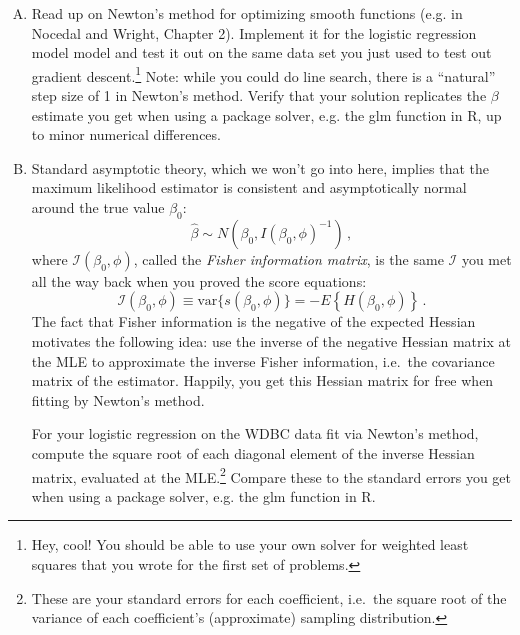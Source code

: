 \documentclass[11pt]{article}
\begin{document}
\begin{enumerate}[(A)]
\item  Read up on Newton's method for optimizing smooth functions (e.g. in Nocedal and Wright, Chapter 2).  Implement it for the logistic regression model model and test it out on the same data set you just used to test out gradient descent.\footnote{Hey, cool!  You should be able to use your own solver for weighted least squares that you wrote for the first set of problems.}  Note: while you could do line search, there is a ``natural'' step size of 1 in Newton's method.  Verify that your solution replicates the $\beta$ estimate you get when using a package solver, e.g. the glm function in R, up to minor numerical differences.  

\item Standard asymptotic theory, which we won't go into here, implies that the maximum likelihood estimator is consistent and asymptotically normal around the true value $\beta_0$:
$$
\hat{\beta} \sim N(\beta_0, I(\beta_0, \phi)^{-1}) \, ,
$$
where $\mathcal{I}(\beta_0, \phi)$, called the \textit{Fisher information matrix}, is the same $\mathcal{I}$ you met all the way back when you proved the score equations:  
$$
\mathcal{I}(\beta_0, \phi) \equiv \mbox{var} \{ s(\beta_0, \phi) \}  = - E \left\{ H(\beta_0, \phi) \right\} \, .
$$
The fact that Fisher information is the negative of the expected Hessian motivates the following idea: use the inverse of the negative Hessian matrix at the MLE to approximate the inverse Fisher information, i.e.~the covariance matrix of the estimator.  Happily, you get this Hessian matrix for free when fitting by Newton's method.

For your logistic regression on the WDBC data fit via Newton's method, compute the square root of each diagonal element of the inverse Hessian matrix, evaluated at the MLE.\footnote{These are your standard errors for each coefficient, i.e.~the square root of the variance of each coefficient's (approximate) sampling distribution.}  Compare these to the standard errors you get when using a package solver, e.g. the glm function in R.  


\end{enumerate}
\end{document}
